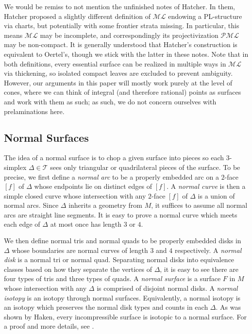 \documentclass[12pt]{article}
\newcommand{\ML}{\mathcal{ML}}
\newcommand{\PML}{\mathcal{PML}}
\newcommand{\T}{\mathcal{T}}
\renewcommand{\it}{\textit}
\theoremstyle{nonumberdefinition}
\theoremstyle{empty}
\theoremstyle{empty}
\begin{document}
We would be remiss to not mention the unfinished notes \cite{hatcherMeasuredLaminationSpaces1999} of Hatcher. In them, Hatcher proposed a slightly different definition of $\ML$ endowing a PL-structure via charts, but potentially with some frontier strata missing. In particular, this means $\ML$ may be incomplete, and correspondingly its projectivization $\PML$ may be non-compact. It is generally understood that Hatcher's construction is equivalent to Oertel's, though we stick with the latter in these notes. Note that in both definitions, every essential surface can be realized in multiple ways in $\ML$ via thickening, so isolated compact leaves are excluded to prevent ambiguity. However, our arguments in this paper will mostly work purely at the level of cones, where we can think of integral (and therefore rational) points as surfaces and work with them as such; as such, we do not concern ourselves with prelaminations here.

\subsection{Normal Surfaces}

The idea of a normal surface is to chop a given surface into pieces so each $3$-simplex $\Delta \in \T$ sees only triangular or quadrilateral pieces of the surface. To be precise, we first define a \it{normal arc} to be a properly embedded arc on a $2$-face $[f]$ of $\Delta$ whose endpoints lie on distinct edges of $[f]$. A \it{normal curve} is then a simple closed curve whose intersection with any $2$-face $[f]$ of $\Delta$ is a union of normal arcs. Since $\Delta$ inherits a geometry from $M$, it suffices to assume all normal arcs are straight line segments. It is easy to prove a normal curve which meets each edge of $\Delta$ at most once has length $3$ or $4$.

We then define {normal tris} and {normal quads} to be properly embedded disks in $\Delta$ whose boundaries are normal curves of length $3$ and $4$ respectively. A \it{normal disk} is a normal tri or normal quad. Separating normal disks into equivalence classes based on how they separate the vertices of $\Delta$, it is easy to see there are four types of tris and three types of quads. A \it{normal surface} is a surface $F$ in $M$ whose intersection with any $\Delta$ is comprised of disjoint normal disks. A \it{normal isotopy} is an isotopy through normal surfaces. Equivalently, a normal isotopy is an isotopy which preserves the normal disk types and counts in each $\Delta$. As was shown by Haken, every incompressible surface is isotopic to a normal surface. For a proof and more details, see \cite{schultensIntroduction3manifolds2014}.
\end{document}
